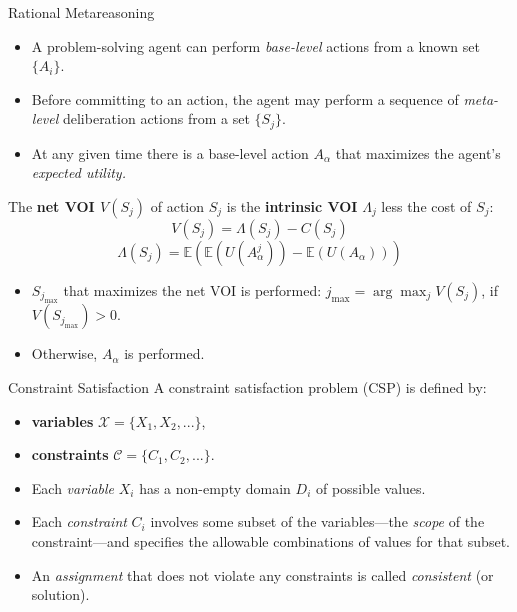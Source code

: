\documentclass{beamer}
\begin{document}
\begin{frame}{Rational Metareasoning}
\begin{itemize}
\item A problem-solving agent can perform {\it base-level} actions from a known
          set $\{A_i\}$.
\item Before committing to an action, the agent may perform a sequence of
          {\it meta-level} deliberation actions from a set $\{S_j\}$.
\item At any given time there is a base-level action $A_\alpha$ that maximizes
          the agent's {\it expected utility.}
\end{itemize}

          The {\bf net VOI $V(S_j)$} of action $S_j$ is the {\bf intrinsic VOI} $\Lambda_j$ less the cost of $S_j$:
          \[V(S_j)=\Lambda(S_j)-C(S_j)\]
           \[\Lambda(S_j)=\mathbb{E}\left(\mathbb{E}(U(A_\alpha^j))-\mathbb{E}(U(A_\alpha))\right)\]

\begin{itemize} 
\item  $S_{j_{\max}}$ that maximizes the net VOI  is performed: $j_{\max} = \arg\max_jV(S_j)$, if $V(S_{j_{\max}})>0$.
\item Otherwise, $A_\alpha$ is performed.
\end{itemize}
\end{frame}

\begin{frame}{Constraint Satisfaction}
A constraint satisfaction problem (CSP) is defined by:
\begin{itemize}
\item[] {\bf variables} $\mathcal{X}=\{X_1, X_2, ...\}$, 
\item[] {\bf constraints} $\mathcal{C}=\{C_1, C_2, ...\}$. 
\end{itemize}
\begin{itemize}
 \item Each {\it variable} $X_i$ has a non-empty domain
          $D_i$ of possible values. 
\item Each {\it constraint} $C_i$ involves some subset
          of the variables---the {\it scope} of the constraint---and specifies the
          allowable combinations of values for that subset. 
\item An {\it assignment} that does not violate any constraints is called
          {\it consistent} (or solution).
 \end{itemize}
 \end{frame}
\end{document}
